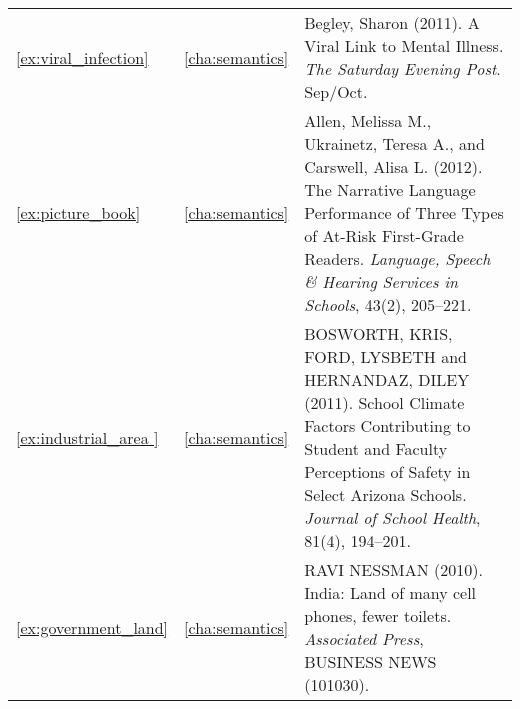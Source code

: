 \begin{longtable}{lcp{8.5cm}}
\ref{ex:viral_infection}&\ref{cha:semantics}&Begley, Sharon (2011). A Viral Link to Mental Illness. \emph{The Saturday Evening Post}. Sep/Oct.\\
\ref{ex:picture_book}&\ref{cha:semantics}&Allen, Melissa M., Ukrainetz, Teresa A., and Carswell, Alisa L. (2012). The Narrative Language Performance of Three Types of At-Risk First-Grade Readers. \emph{Language, Speech \& Hearing Services in Schools}, 43(2), 205--221.\\
\ref{ex:industrial_area }&\ref{cha:semantics}&BOSWORTH, KRIS, FORD, LYSBETH and HERNANDAZ, DILEY (2011). School Climate Factors Contributing to Student and Faculty Perceptions of Safety in Select Arizona Schools. \emph{Journal of School Health}, 81(4), 194--201.\\
\ref{ex:government_land}&\ref{cha:semantics}&RAVI NESSMAN (2010). India: Land of many cell phones, fewer toilets. \emph{Associated Press}, BUSINESS NEWS (101030).\\

\end{longtable}
